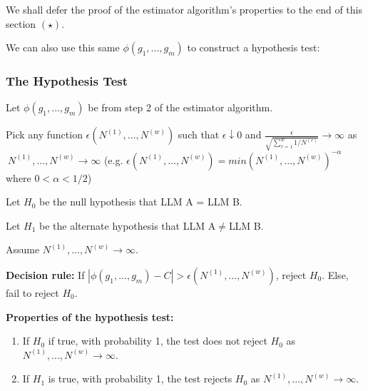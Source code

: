 \documentclass{article}
\begin{document}
We shall defer the proof of the estimator algorithm's properties to the end of this section $\displaystyle \left( \star \right)$.



We can also use this same $\displaystyle \phi \left( g_{1} ,...,g_{m}\right)$ to construct a hypothesis test:



\subsubsection{The Hypothesis Test}

Let $\displaystyle \phi \left( g_{1} ,...,g_{m}\right)$ be from step 2 of the estimator algorithm.

Pick any function $\displaystyle \epsilon \left( N^{\left( 1\right)} ,...,N^{\left( w\right)}\right)$ such that $\displaystyle \epsilon \downarrow 0$ and $\displaystyle \frac{\epsilon }{\sqrt{\sum _{r=1}^{w} 1/N^{\left( r\right)}}}\rightarrow \infty $ as $\displaystyle \ N^{\left( 1\right)} ,...,N^{\left( w\right)}\rightarrow \infty $ (e.g. $\displaystyle \epsilon \left( N^{\left( 1\right)} ,...,N^{\left( w\right)}\right) =min\left( N^{\left( 1\right)} ,...,N^{\left( w\right)}\right)^{-\alpha }$ where $\displaystyle 0< \alpha < 1/2$)

Let $\displaystyle H_{0}$ be the null hypothesis that LLM A = LLM B.

Let $\displaystyle H_{1}$ be the alternate hypothesis that LLM A$\displaystyle \neq $LLM B.

Assume $\displaystyle N^{\left( 1\right)} ,...,N^{\left( w\right)}\rightarrow \infty $.



\textbf{Decision rule:} If $\displaystyle |\phi \left( g_{1} ,...,g_{m}\right) -C| >\epsilon \left( N^{\left( 1\right)} ,...,N^{\left( w\right)}\right)$, reject $\displaystyle H_{0}$. Else, fail to reject $\displaystyle H_{0}$.



\textbf{Properties of the hypothesis test:}
\begin{enumerate}
\item If $\displaystyle H_{0}$ if true, with probability 1, the test does not reject $\displaystyle H_{0}$ as $\displaystyle N^{\left( 1\right)} ,...,N^{\left( w\right)}\rightarrow \infty $.
\item If $\displaystyle H_{1}$ is true, with probability 1, the test rejects $\displaystyle H_{0}$ as $\displaystyle N^{\left( 1\right)} ,...,N^{\left( w\right)}\rightarrow \infty $.
\end{enumerate}
\end{document}
